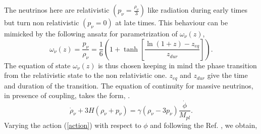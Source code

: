 \documentclass[prd,twocolumn,superscriptaddress]{revtex4}
\begin{document}
The neutrinos here are relativistic $\left( p_{\nu} = \frac{\rho_{\nu}}{3} \right)$
like radiation during early times but turn non relativistic $\left( p_{\nu} = 0 \right)$ at late times. 
This behaviour can be mimicked  by   the following ansatz for parametrization of
$\omega_{\nu} (z)$,
\begin{equation}
\omega_{\nu} (z) = \frac{p_{\nu}}{\rho_{\nu}}
= \frac{1}{6} \left( 1 + \tanh \left[ \frac{\ln (1 + z) - z_{eq}}{z_{dur}} \right] \right) .
\end{equation}
The equation of state $\omega_{\nu} (z)$ is thus chosen keeping in mind the
phase transition from the relativistic state to the non relativistic one.
$z_{eq}$ and $z_{dur}$ give the time and duration of the transition.
The equation of continuity for massive neutrinos, in presence of coupling, takes the form,
\cite{QIPlanck2015SamiWali,ala}.
\begin{equation}
\dot{\rho}_{\nu} + 3 H \left( \rho_{\nu} + p_{\nu} \right)
= \gamma \left( \rho_{\nu} - 3 p_{\nu} \right) \frac{\dot{\phi}}{M_{pl}} . \label{rhonueqn}
\end{equation}
 Varying the action (\ref{action}) with respect to $\phi$ and following the Ref. \cite{ala}, we obtain,
\end{document}
